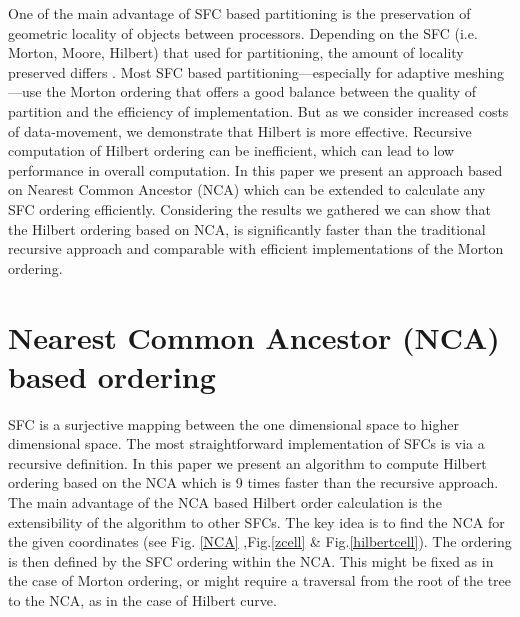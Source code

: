 \documentclass{sig-alternate}
\begin{document}
One of the main advantage of SFC based partitioning is the preservation of
geometric locality of objects between processors. Depending on the SFC (i.e.
Morton, Moore, Hilbert) that used for partitioning, the amount of locality
preserved differs \cite{bader2012}.  
Most SFC based partitioning---especially for adaptive meshing---use the
Morton ordering that offers a good balance between the quality of partition and the 
efficiency of implementation.
But as we consider increased costs of data-movement, we demonstrate that Hilbert is more effective. Recursive
computation of Hilbert ordering can be inefficient, which can lead to low
performance in overall computation.  In this paper we present an approach based
on Nearest Common Ancestor (NCA) which can be extended to calculate any SFC
ordering efficiently. Considering the results we gathered we can show that the
Hilbert ordering based on NCA, is significantly faster than the traditional recursive
approach and comparable with efficient implementations of the Morton ordering. 


\section{Nearest Common Ancestor (NCA) based ordering}
SFC is a surjective mapping between the one dimensional space to higher dimensional space. The most straightforward implementation of SFCs is via a recursive definition.  
In this paper we present an algorithm to compute Hilbert ordering based on the NCA which is 9 times faster than the recursive approach.
The main advantage of the NCA based Hilbert order calculation is the extensibility of the algorithm to other SFCs. 
The key idea is to find the NCA for the given coordinates (see Fig. \ref{NCA} ,Fig.\ref{zcell} \& Fig.\ref{hilbertcell}). The ordering is then defined by the SFC ordering within the NCA.
This might be fixed as in the case of Morton ordering, or might require a traversal from the root of the tree to the NCA, as in the case of Hilbert curve. 
\end{document}
